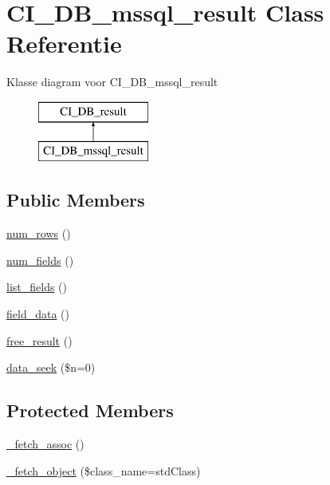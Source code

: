 \hypertarget{class_c_i___d_b__mssql__result}{}\section{C\+I\+\_\+\+D\+B\+\_\+mssql\+\_\+result Class Referentie}
\label{class_c_i___d_b__mssql__result}
Klasse diagram voor C\+I\+\_\+\+D\+B\+\_\+mssql\+\_\+result\begin{figure}[H]
\begin{center}
\leavevmode
\includegraphics[height=2.000000cm]{class_c_i___d_b__mssql__result}
\end{center}
\end{figure}
\subsection*{Public Members}
\begin{DoxyCompactItemize}
\item 
\mbox{\hyperlink{class_c_i___d_b__mssql__result_a218657c303ee499b97710ab0cd2f5d6e}{num\+\_\+rows}} ()
\item 
\mbox{\hyperlink{class_c_i___d_b__mssql__result_af831bf363e4d7d661a717a4932af449d}{num\+\_\+fields}} ()
\item 
\mbox{\hyperlink{class_c_i___d_b__mssql__result_a50b54eb4ea7cfd039740f532988ea776}{list\+\_\+fields}} ()
\item 
\mbox{\hyperlink{class_c_i___d_b__mssql__result_a84bffd65e53902ade1591716749a33e3}{field\+\_\+data}} ()
\item 
\mbox{\hyperlink{class_c_i___d_b__mssql__result_aad2d98d6beb3d6095405356c6107b473}{free\+\_\+result}} ()
\item 
\mbox{\hyperlink{class_c_i___d_b__mssql__result_a8255ae91816e4206e29eb7581c5af0f1}{data\+\_\+seek}} (\$n=0)
\end{DoxyCompactItemize}
\subsection*{Protected Members}
\begin{DoxyCompactItemize}
\item 
\mbox{\hyperlink{class_c_i___d_b__mssql__result_a43a9a92817f1334a1c10752ec44275a0}{\+\_\+fetch\+\_\+assoc}} ()
\item 
\mbox{\hyperlink{class_c_i___d_b__mssql__result_a60806be6a9c2488820813c2a7f4fef71}{\+\_\+fetch\+\_\+object}} (\$class\+\_\+name=\textquotesingle{}std\+Class\textquotesingle{})
\end{DoxyCompactItemize}
